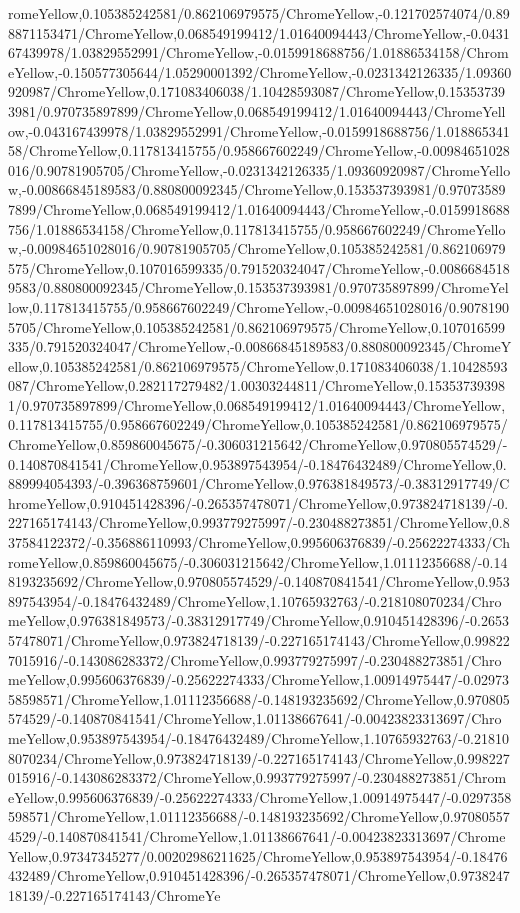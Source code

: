 {\begin{tikzternal}
{romeYellow,0.105385242581/0.862106979575/ChromeYellow,-0.121702574074/0.898871153471/ChromeYellow,0.068549199412/1.01640094443/ChromeYellow,-0.043167439978/1.03829552991/ChromeYellow,-0.0159918688756/1.01886534158/ChromeYellow,-0.150577305644/1.05290001392/ChromeYellow,-0.0231342126335/1.09360920987/ChromeYellow,0.171083406038/1.10428593087/ChromeYellow,0.153537393981/0.970735897899/ChromeYellow,0.068549199412/1.01640094443/ChromeYellow,-0.043167439978/1.03829552991/ChromeYellow,-0.0159918688756/1.01886534158/ChromeYellow,0.117813415755/0.958667602249/ChromeYellow,-0.00984651028016/0.90781905705/ChromeYellow,-0.0231342126335/1.09360920987/ChromeYellow,-0.00866845189583/0.880800092345/ChromeYellow,0.153537393981/0.970735897899/ChromeYellow,0.068549199412/1.01640094443/ChromeYellow,-0.0159918688756/1.01886534158/ChromeYellow,0.117813415755/0.958667602249/ChromeYellow,-0.00984651028016/0.90781905705/ChromeYellow,0.105385242581/0.862106979575/ChromeYellow,0.107016599335/0.791520324047/ChromeYellow,-0.00866845189583/0.880800092345/ChromeYellow,0.153537393981/0.970735897899/ChromeYellow,0.117813415755/0.958667602249/ChromeYellow,-0.00984651028016/0.90781905705/ChromeYellow,0.105385242581/0.862106979575/ChromeYellow,0.107016599335/0.791520324047/ChromeYellow,-0.00866845189583/0.880800092345/ChromeYellow,0.105385242581/0.862106979575/ChromeYellow,0.171083406038/1.10428593087/ChromeYellow,0.282117279482/1.00303244811/ChromeYellow,0.153537393981/0.970735897899/ChromeYellow,0.068549199412/1.01640094443/ChromeYellow,0.117813415755/0.958667602249/ChromeYellow,0.105385242581/0.862106979575/ChromeYellow,0.859860045675/-0.306031215642/ChromeYellow,0.970805574529/-0.140870841541/ChromeYellow,0.953897543954/-0.18476432489/ChromeYellow,0.889994054393/-0.396368759601/ChromeYellow,0.976381849573/-0.38312917749/ChromeYellow,0.910451428396/-0.265357478071/ChromeYellow,0.973824718139/-0.227165174143/ChromeYellow,0.993779275997/-0.230488273851/ChromeYellow,0.837584122372/-0.356886110993/ChromeYellow,0.995606376839/-0.25622274333/ChromeYellow,0.859860045675/-0.306031215642/ChromeYellow,1.01112356688/-0.148193235692/ChromeYellow,0.970805574529/-0.140870841541/ChromeYellow,0.953897543954/-0.18476432489/ChromeYellow,1.10765932763/-0.218108070234/ChromeYellow,0.976381849573/-0.38312917749/ChromeYellow,0.910451428396/-0.265357478071/ChromeYellow,0.973824718139/-0.227165174143/ChromeYellow,0.998227015916/-0.143086283372/ChromeYellow,0.993779275997/-0.230488273851/ChromeYellow,0.995606376839/-0.25622274333/ChromeYellow,1.00914975447/-0.0297358598571/ChromeYellow,1.01112356688/-0.148193235692/ChromeYellow,0.970805574529/-0.140870841541/ChromeYellow,1.01138667641/-0.00423823313697/ChromeYellow,0.953897543954/-0.18476432489/ChromeYellow,1.10765932763/-0.218108070234/ChromeYellow,0.973824718139/-0.227165174143/ChromeYellow,0.998227015916/-0.143086283372/ChromeYellow,0.993779275997/-0.230488273851/ChromeYellow,0.995606376839/-0.25622274333/ChromeYellow,1.00914975447/-0.0297358598571/ChromeYellow,1.01112356688/-0.148193235692/ChromeYellow,0.970805574529/-0.140870841541/ChromeYellow,1.01138667641/-0.00423823313697/ChromeYellow,0.97347345277/0.00202986211625/ChromeYellow,0.953897543954/-0.18476432489/ChromeYellow,0.910451428396/-0.265357478071/ChromeYellow,0.973824718139/-0.227165174143/ChromeYe}
\end{tikzternal}}
